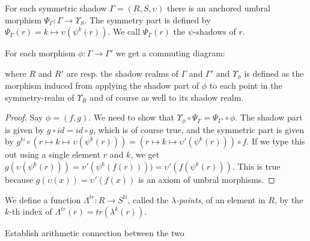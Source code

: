 \begin{propdef}
  For each symmetric shadow $\Gamma = (R, S, \upsilon)$ there is an anchored umbral morphism $\Psi_{\Gamma} : \Gamma \to \Upsilon_S$. The symmetry part is defined by $\Psi_{\Gamma}(r) = k \mapsto \upsilon(\psi^k(r))$. We call $\Psi_{\Gamma}(r)$ the $\psi$-shadows of $r$.
\end{propdef}

\begin{propdef} \label{propdef:upsilonUniversalDiagram}
  For each morphism $\phi : \Gamma \to \Gamma'$ we get a commuting diagram:
  \begin{center}
  \end{center}
  where $R$ and $R'$ are resp. the shadow realms of $\Gamma$ and $\Gamma'$ and $\Upsilon_{\phi}$ is defined as the morphism induced from applying the shadow part of $\phi$ to each point in the symmetry-realm of $\Upsilon_R$ and of course as well to its shadow realm.
\end{propdef}

\begin{proof}
  Say $\phi = (f, g)$. We need to show that $\Upsilon_{\phi} \circ \Psi_\Gamma = \Psi_{\Gamma'} \circ \phi$. The shadow part is given by $g \circ id = id \circ g$, which is of course true, and the symmetric part is given by $g^{\mathbb{N}} \circ (r \mapsto k \mapsto \upsilon(\psi^k(r))) = (r \mapsto k \mapsto \upsilon'(\psi^k(r))) \circ f$. If we type this out using a single element $r$ and $k$, we get $g(\upsilon(\psi^k(r))) = \upsilon'(\psi^k(f(r)))) = \upsilon'(f(\psi^k(r)))$. This is true because $g(\upsilon(x)) = \upsilon'(f(x))$ is an axiom of umbral morphisms. \qedhere
\end{proof}

\begin{definition}
    We define a function $\Lambda^{tr} : R \to S^{\mathbb{N}}$, called the \emph{$\lambda$-points}, of an element in $R$, by the $k$-th index of $\Lambda^{tr}(r) = tr(\lambda^k(r))$. 
\end{definition}

\begin{proposition} 
  Establish arithmetic connection between the two
\end{proposition}

